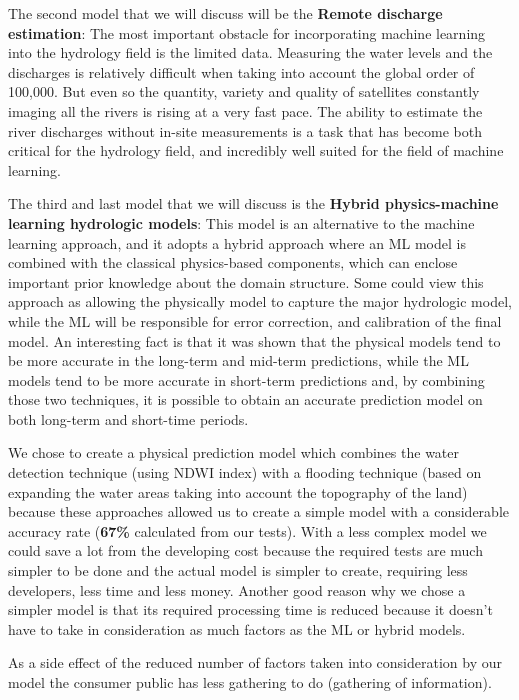 \documentclass[12pt, a4paper]{report}
\begin{document}
The second model that we will discuss will be the \textbf{Remote discharge estimation}: The most important obstacle for incorporating machine learning into the hydrology field is the limited data. Measuring the water levels and the discharges is relatively difficult when taking into account the global order of 100,000. But even so the quantity, variety and quality of satellites constantly imaging all the rivers is rising at a very fast pace. The ability to estimate the river discharges without in-site measurements is a task that has become both critical for the hydrology field, and incredibly well suited for the field of machine learning.
\par 

The third and last model that we will discuss is the \textbf{Hybrid physics-machine learning hydrologic models}: This model is an alternative to the machine learning approach, and it adopts a hybrid approach where an ML model is combined with the classical physics-based components, which can enclose important prior knowledge about the domain structure. Some could view this approach as allowing the physically model to capture the major hydrologic  model, while the ML will be responsible for error correction, and calibration of the final model. An interesting fact is that it was shown that the physical models tend to be more accurate in the long-term and mid-term predictions, while the ML models tend to be more accurate in short-term predictions and, by combining those two techniques, it is possible to obtain an accurate prediction model on both long-term and short-time periods.
\par 

We chose to create a physical prediction model which combines the water detection technique (using NDWI index) with a flooding technique (based on expanding the water areas taking into account the topography of the land) because these approaches allowed us to create a simple model with a considerable accuracy rate (\textbf{67\%} calculated from our tests). With a less complex model we could save a lot from the developing cost because the required tests are much simpler to be done and the actual model is simpler to create, requiring less developers, less time and less money. Another good reason why we chose a simpler model is that its required processing time is reduced because it doesn't have to take in consideration as much factors as the ML or hybrid models. 
\par 

As a side effect of the reduced number of factors taken into consideration  by our model the consumer public has less gathering to do (gathering of information).
\end{document}
